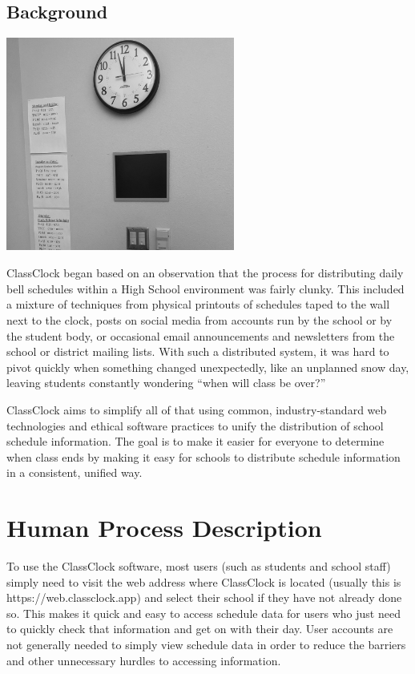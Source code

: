 \documentclass{article}
\begin{document}
\subsection{Background}

\begin{center}
\includegraphics[width=2.9547in,height=2.7646in]{images/graywallclock.jpg}
\end{center}

{ClassClock began based on an observation that the process for distributing daily bell schedules within a High School
environment was fairly clunky. This included a mixture of techniques from physical printouts of schedules taped to the
wall next to the clock, posts on social media from accounts run by the school or by the student body, or occasional
email announcements and newsletters from the school or district mailing lists. With such a distributed system, it was
hard to pivot quickly when something changed unexpectedly, like an unplanned snow day, leaving students constantly
wondering “when will class be over?”}


{ClassClock aims to simplify all of that using common, industry-standard web technologies and ethical software practices
to unify the distribution of school schedule information. The goal is to make it easier for everyone to determine when
class ends by making it easy for schools to distribute schedule information in a consistent, unified way.}

\section{Human Process Description}
{To use the ClassClock software, most users (such as students and school staff) simply need to visit the web address
where ClassClock is located (usually this is https://web.classclock.app) and select their school if they have not
already done so. This makes it quick and easy to access schedule data for users who just need to quickly check that
information and get on with their day. User accounts are not generally needed to simply view schedule data in order to
reduce the barriers and other unnecessary hurdles to accessing information.}
\end{document}
